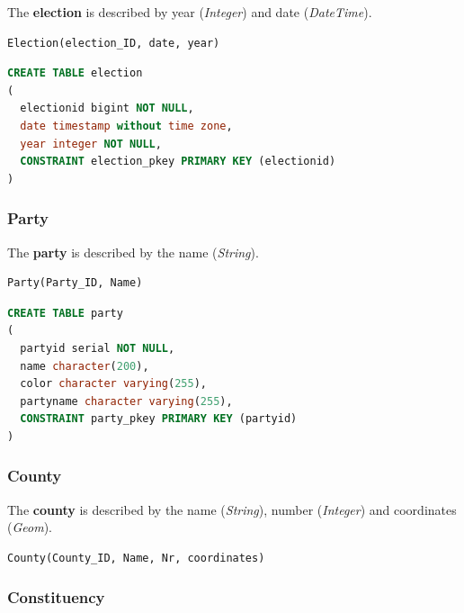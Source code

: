 The \textbf{election} is described by year (\textit{Integer}) and date
(\textit{DateTime}).

\begin{lstlisting}[caption=Election Relational Algebra,numbers=none]
Election(election_ID, date, year)
\end{lstlisting}

\begin{lstlisting}[caption=Election SQL,language=SQL]
CREATE TABLE election
(
  electionid bigint NOT NULL,
  date timestamp without time zone,
  year integer NOT NULL,
  CONSTRAINT election_pkey PRIMARY KEY (electionid)
)
\end{lstlisting}



\subsubsection{Party}\label{ImplementationParty}


The \textbf{party} is described by the name (\textit{String}).

\begin{lstlisting}[caption=Party Relational Algebra,numbers=none]
Party(Party_ID, Name)
\end{lstlisting}


\begin{lstlisting}[caption=Party SQL,language=SQL]
CREATE TABLE party
(
  partyid serial NOT NULL,
  name character(200),
  color character varying(255),
  partyname character varying(255),
  CONSTRAINT party_pkey PRIMARY KEY (partyid)
)
\end{lstlisting}


\subsubsection{County}\label{ImplementationCounty}

The \textbf{county} is described by the name (\textit{String}), number
(\textit{Integer}) and coordinates (\textit{Geom}).


\begin{lstlisting}[caption=County Relational Algebra,numbers=none]
County(County_ID, Name, Nr, coordinates)
\end{lstlisting}



\subsubsection{Constituency}\label{ImplementationConstituency}

